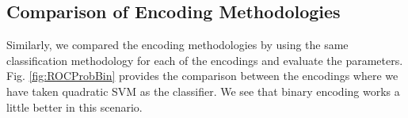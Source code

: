\documentclass{article} %
\begin{document}
	\subsection{Comparison of Encoding Methodologies}
	
	Similarly, we compared the encoding methodologies by using the same classification methodology for each of the encodings and evaluate the parameters. Fig. \ref{fig:ROCProbBin} provides the comparison between the encodings where we have taken quadratic SVM as the classifier. We see that binary encoding works a little better in this scenario.
	
	\begin{figure}[h]
		\begin{center}

\end{center}
\end{figure}
\end{document}
